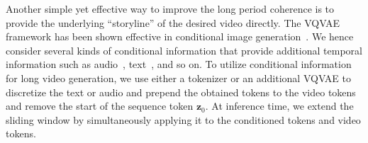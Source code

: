 Another simple yet effective way to improve the long period coherence is to provide the underlying ``storyline'' of the desired video directly. 
The VQVAE framework has been shown effective in conditional image generation~\cite{esser2021taming,ramesh2021zero}. 
We hence consider several kinds of conditional information that provide additional temporal information such as audio~\cite{chatterjee2020sound2sight}, text~\cite{wu2021godiva}, and so on. 
To utilize conditional information for long video generation, we use either a tokenizer or an additional VQVAE to discretize the text or audio and prepend the obtained tokens to the video tokens and remove the start of the sequence token $\mathbf{z}_0$. 
At inference time, we extend the sliding window by simultaneously applying it to the conditioned tokens and video tokens.

